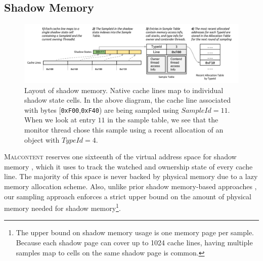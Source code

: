 \documentclass[letterpaper,twocolumn,10pt]{article}
\newcommand{\TextToolname}{Malcontent}
\newcommand{\Toolname}{\textsc{\TextToolname{}}}
\begin{document}
\subsection{Shadow Memory}
\begin{figure}
\includegraphics[width=\textwidth]{shadow.pdf}
\caption{\label{fig:layout_of_shadow}Layout of shadow memory. Native cache lines map to individual shadow state cells. %
 In the above %
diagram, the cache line associated with bytes [\texttt{0xF00},\texttt{0xF40}) are being sampled using $SampleId=11$. When %
we look at entry $11$ in the sample table, we see that the monitor thread chose this sample using a recent allocation of an %
object with $TypeId=4$.}
\end{figure}

\Toolname{} reserves one sixteenth of the virtual address space for shadow memory \cite{Umbra}, which it uses to track the watched and
ownership state of every cache line. The majority of this space is never backed by physical memory due to a lazy memory allocation
scheme. Also, unlike prior shadow memory-based approaches \cite{DrContention}, our sampling approach enforces a strict upper
bound on the amount of physical memory needed for shadow memory\footnote{The upper bound on shadow memory usage is one
memory page per sample. Because each shadow page can cover up to 1024 cache lines, having multiple samples map to cells on the
same shadow page is common.}.

\end{document}

